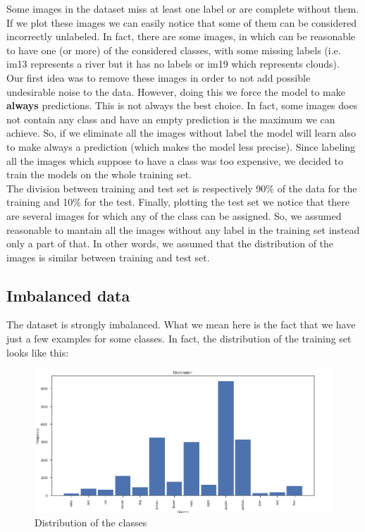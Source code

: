 Some images in the dataset miss at least one label or are complete without them. If we plot these images we can easily notice that some of them can be considered incorrectly unlabeled. In fact, there are some images, in which can be reasonable to have one (or more) of the considered classes, with some missing labels (i.e. im13 represents a river but it has no labels or im19 which represents clouds). \\
Our first idea was to remove these images in order to not add possible undesirable noise to the data. However, doing this we force the model to make \textbf{always} predictions. This is not always the best choice. In fact, some images does not contain any class and have an empty prediction is the maximum we can achieve. So, if we eliminate all the images without label the model will learn also to make always a prediction (which makes the model less precise).
Since labeling all the images which suppose to have a class was too expensive, we decided to train the models on the whole training set. \\
The division between training and test set is respectively 90\% of the data for the training and 10\% for the test.
Finally, plotting the test set we notice that there are several images for which any of the class can be assigned. So, we assumed reasonable to mantain all the images without any label in the training set instead only a part of that. In other words, we assumed that the distribution of the images is similar between training and test set.

\subsection{Imbalanced data}

The dataset is strongly imbalanced. What we mean here is the fact that we have just a few examples for some classes. In fact, the distribution of the training set looks like this:

\begin{figure}[!h]
	\begin{center}
		\includegraphics[width=0.6\linewidth]{images/distribution}
		\caption{Distribution of the classes}
		\label{fig:distribution-classes}
	\end{center}
\end{figure}

